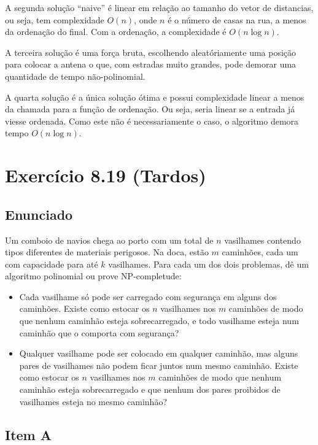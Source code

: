 \documentclass[11pt]{article}
\begin{document}
A segunda solução ``naive'' é linear em relação ao tamanho do vetor de
distancias, ou seja, tem complexidade $O(n)$, onde $n$ é o número de
casas na rua, a menos da ordenação do final. Com a ordenação, a
complexidade é $O(n \log n)$.

A terceira solução é uma força bruta, escolhendo aleatóriamente uma
posição para colocar a antena o que, com estradas muito grandes, pode
demorar uma quantidade de tempo não-polinomial.

A quarta solução é a única solução ótima e possui complexidade linear
a menos da chamada para a função de ordenação. Ou seja, seria linear
se a entrada já viesse ordenada. Como este não é necessariamente o
caso, o algoritmo demora tempo $O(n\log n)$.
\pagebreak

\section{Exercício 8.19 (Tardos)}
\label{sec-6}

\subsection{Enunciado}
\label{sec-6-1}

Um comboio de navios chega ao porto com um total de $n$ vasilhames
contendo tipos diferentes de materiais perigosos.
Na doca, estão $m$ caminhões, cada um com capacidade para até $k$
vasilhames.  Para cada um dos dois problemas, dê um algoritmo
polinomial ou prove NP-completude:


\begin{itemize}
\item Cada vasilhame só pode ser carregado com segurança em alguns
dos caminhões. Existe como estocar os $n$ vasilhames nos $m$
caminhões de modo que nenhum caminhão esteja sobrecarregado, e
todo vasilhame esteja num caminhão que o comporta com segurança?

\item Qualquer vasilhame pode ser colocado em qualquer caminhão,
mas alguns pares de vasilhames não podem ficar juntos num mesmo
caminhão. Existe como estocar os $n$ vasilhames nos $m$
caminhões de modo que nenhum caminhão esteja sobrecarregado e
que nenhum dos pares proibidos de vasilhames esteja no mesmo
caminhão?
\end{itemize}

\subsection{Item A}
\label{sec-6-2}
\end{document}
